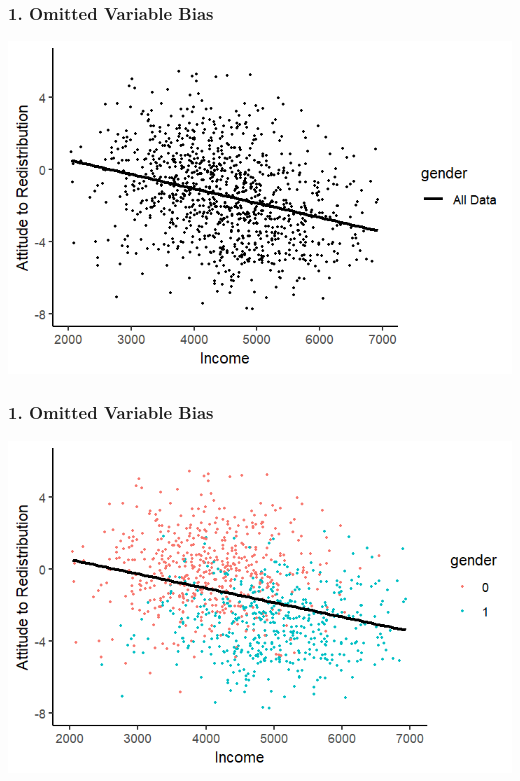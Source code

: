 \documentclass[xcolor=x11names,compress]{beamer}\usepackage[]{graphicx}\usepackage[]{color}
\makeatletter
\def\maxwidth{ %
  \ifdim\Gin@nat@width>\linewidth
    \linewidth
  \else
    \Gin@nat@width
  \fi
}
\newenvironment{knitrout}{}{} %
\renewcommand{\(}{\begin{columns}}
\renewcommand{\)}{\end{columns}}
\newcommand{\<}[1]{\begin{column}{#1}}
\renewcommand{\>}{\end{column}}
\makeatother
\begin{document}
\begin{frame}
\frametitle{1. Omitted Variable Bias}
\begin{knitrout}
\color{fgcolor}
\includegraphics[width=\maxwidth]{figure/confound3c-1} 

\end{knitrout}
\end{frame}

\begin{frame}
\frametitle{1. Omitted Variable Bias}
\begin{knitrout}
\color{fgcolor}
\includegraphics[width=\maxwidth]{figure/confound2-1} 

\end{knitrout}
\end{frame}
\end{document}
